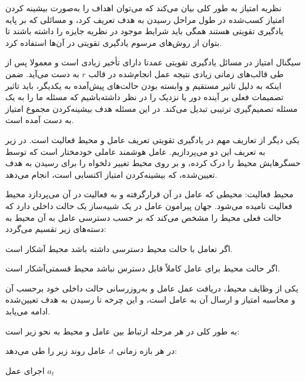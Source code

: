 نظریه امتیاز به طور کلی بیان می‌کند که می‌توان اهداف را به‌صورت بیشینه کردن امتیاز کسب‌شده در طول مراحل رسیدن به هدف تعریف کرد، و مسائلی که بر پایه یادگیری تقویتی هستند همگی باید شرایط موجود در نظریه جایزه را داشته باشند تا بتوان از روش‌های مرسوم یادگیری تقویتی در آن‌ها استفاده کرد.


سیگنال امتیاز در مسائل یادگیری تقویتی عمدتا دارای تأخیر زیادی است و معمولا پس از طی قالب‌های زمانی زیادی نتیجه عمل انجام‌شده در قالب $r$ به دست می‌آید. ضمن اینکه به دلیل تاثیر مستقیم و وابسته بودن حالت‌های پیش‌آمده به یکدیگر، باید تاثیر تصمیمات فعلی بر آینده دور یا نزدیک را در نظر داشته‌باشیم که مسئله ما را به یک مسئله تصمیم‌گیری ترتیبی تبدیل می‌کند. در این مسئله هدف بیشینه‌کردن مجموع امتیاز به دست آمده ‌است. 



یکی دیگر از تعاریف مهم در یادگیری تقویتی تعریف عامل و محیط فعالیت است. در زیر به تعریف این دو می‌پردازیم. عامل هوشمند عاملی خودمختار است که توسط حسگرهایش محیط را درک کرده،  و بر روی محیط تغییر دلخواه را برای رسیدن به هدف تعیین‌شده، که بیشینه‌کردن امتیاز اکتسابی است، انجام می‌دهد.





محیط فعالیت: محیطی که عامل در آن قرارگرفته و به فعالیت در آن می‌پردازد محیط فعالیت نامیده می‌شود. جهان پیرامون عامل در یک شبیه‌ساز یک حالت داخلی دارد که حالت فعلی محیط را مشخص می‌کند که بر حسب دسترسی عامل به آن محیط به دسته‌های زیر تقسیم می‌گردد:


 اگر تعامل با حالت محیط دسترسی داشته باشد محیط آشکار است.

 اگر حالت محیط برای عامل کاملاً قابل دسترس نباشد محیط قسمتی‌آشکار است.


یکی از وظایف محیط، دریافت عمل عامل و به‌روزرسانی حالت داخلی خود برحسب آن و محاسبه امتیاز و ارسال آن به عامل است، و این چرخه تا رسیدن به هدف تعیین‌شده ادامه می‌یابد.

به طور کلی در هر مرحله ارتباط بین عامل و محیط به نحو زیر است: 


 در هر بازه زمانی $t$، عامل روند زیر را طی می‌دهد:


 اجرای عمل $a_t$


